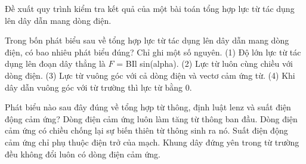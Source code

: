 \begin{bt}
Đề xuất quy trình kiểm tra kết quả của một bài toán tổng hợp lực từ tác dụng lên dây dẫn mang dòng điện.
\end{bt}

\begin{ex}
Trong bốn phát biểu sau về tổng hợp lực từ tác dụng lên dây dẫn mang dòng điện, có bao nhiêu phát biểu đúng? Chỉ ghi một số nguyên. (1) Độ lớn lực từ tác dụng lên đoạn dây thẳng là $F$ = BIl sin(alpha). (2) Lực từ luôn cùng chiều với dòng điện. (3) Lực từ vuông góc với cả dòng điện và vectơ cảm ứng từ. (4) Khi dây dẫn vuông góc với từ trường thì lực từ bằng 0.
\end{ex}

\begin{ex}
Phát biểu nào sau đây đúng về tổng hợp từ thông, định luật lenz và suất điện động cảm ứng?
\choice
{Dòng điện cảm ứng luôn làm tăng từ thông ban đầu.}
{\True Dòng điện cảm ứng có chiều chống lại sự biến thiên từ thông sinh ra nó.}
{Suất điện động cảm ứng chỉ phụ thuộc điện trở của mạch.}
{Khung dây đứng yên trong từ trường đều không đổi luôn có dòng điện cảm ứng.}
\end{ex}

